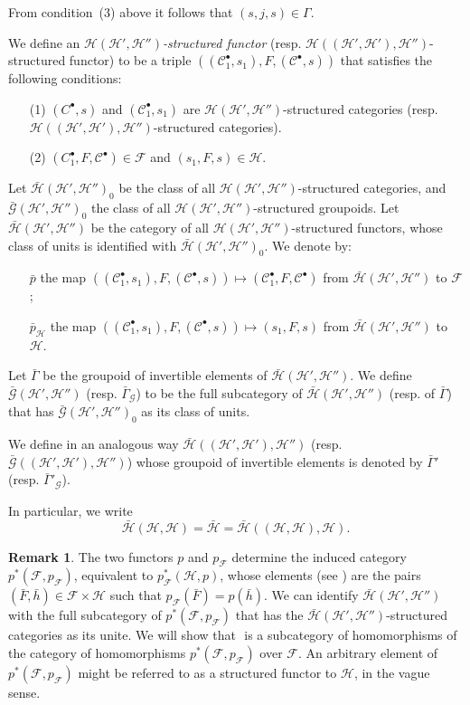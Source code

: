 \documentclass[a4paper,fleqn]{article}
\theoremstyle{plain}
\theoremstyle{definition}
\newenvironment{definition}[1]
  {\renewcommand\theinnerdefinition{#1}\innerdefinition}
  {\endinnerdefinition}
\newtheorem*{remark}{Remark}
\newcommand{\oldpage}[1]{{\marginpar{\footnotesize$\bigg\vert$\,\,\,\,\textit{p.~#1}}}}
\newcommand{\CC}{\mathcal{C}}
\newcommand{\HH}{\mathcal{H}}
\newcommand{\bHH}{\bar{\HH}}
\newcommand{\FF}{\mathcal{F}}
\newcommand{\GG}{\mathcal{G}}
\begin{document}
From condition~(3) above it follows that $(s,j,s)\in\Gamma$.

\begin{definition}{5}
\label{definition:ii-5}
  We define an \emph{$\HH(\HH',\HH'')$-structured functor} (resp. $\HH((\HH',\HH'),\HH'')$-structured functor) to be a triple $((\CC_1^\bullet,s_1),F,(\CC^\bullet,s))$ that satisfies the following conditions:
  \begin{enumerate}
    \item[\normalfont(1)]
      $(C^\bullet,s)$ and $(\CC_1^\bullet,s_1)$ are $\HH(\HH',\HH'')$-structured categories (resp. $\HH((\HH',\HH'),\HH'')$-structured categories).

    \item[\normalfont(2)]
      $(C_1^\bullet,F,\CC^\bullet)\in\FF$ and $(s_1,F,s)\in\HH$.
  \end{enumerate}
\end{definition}

Let $\bHH(\HH',\HH'')_0$ be the class of all $\HH(\HH',\HH'')$-structured categories, and $\bar{\GG}(\HH',\HH'')_0$ the class of all $\HH(\HH',\HH'')$-structured groupoids.
Let $\bHH(\HH',\HH'')$ be the category of all $\HH(\HH',\HH'')$-structured functors, whose class of units is identified with $\bHH(\HH',\HH'')_0$.
We denote by:
\begin{itemize}
  \item[]
    $\bar{p}$ the map $((\CC_1^\bullet,s_1),F,(\CC^\bullet,s))\mapsto(\CC_1^\bullet,F,\CC^\bullet)$ from $\bHH(\HH',\HH'')$ to $\FF$;

  \item[]
    $\bar{p}_\HH$ the map $((\CC_1^\bullet,s_1),F,(\CC^\bullet,s))\mapsto(s_1,F,s)$ from $\bHH(\HH',\HH'')$ to $\HH$.
\end{itemize}

Let $\bar{\Gamma}$ be the groupoid of invertible elements of $\bHH(\HH',\HH'')$.
We define $\bar{\GG}(\HH',\HH'')$ (resp. $\bar{\Gamma}_\GG$) to be the full subcategory of $\bHH(\HH',\HH'')$ (resp. of $\bar{\Gamma}$) that has $\bar{\GG}(\HH',\HH'')_0$ as its class of units.

We define in an analogous way $\bHH((\HH',\HH'),\HH'')$ (resp. $\bar{\GG}((\HH',\HH'),\HH'')$) whose groupoid of invertible elements is denoted by $\bar{\Gamma}'$ (resp. $\bar{\Gamma}'_\GG$).

In particular, we write
\[
  \bHH(\HH,\HH)
  = \bHH
  = \bHH((\HH,\HH),\HH).
\]

\oldpage{385}
\begin{remark}
  The two functors $p$ and $p_\FF$ determine the induced category $p^*(\FF,p_\FF)$, equivalent to $p_\FF^*(\HH,p)$, whose elements (see \cite{3a}) are the pairs $(\bar{F},\bar{h})\in\FF\times\HH$ such that $p_\FF(\bar{F})=p(\bar{h})$.
  We can identify $\bHH(\HH',\HH'')$ with the full subcategory of $p^*(\FF,p_\FF)$ that has the $\bHH(\HH',\HH'')$-structured categories as its unite.
  We will show that $ $ is a subcategory of homomorphisms of the category of homomorphisms $p^*(\FF,p_\FF)$ over $\FF$.
  An arbitrary element of $p^*(\FF,p_\FF)$ might be referred to as a structured functor to $\HH$, in the vague sense.
\end{remark}
\end{document}
